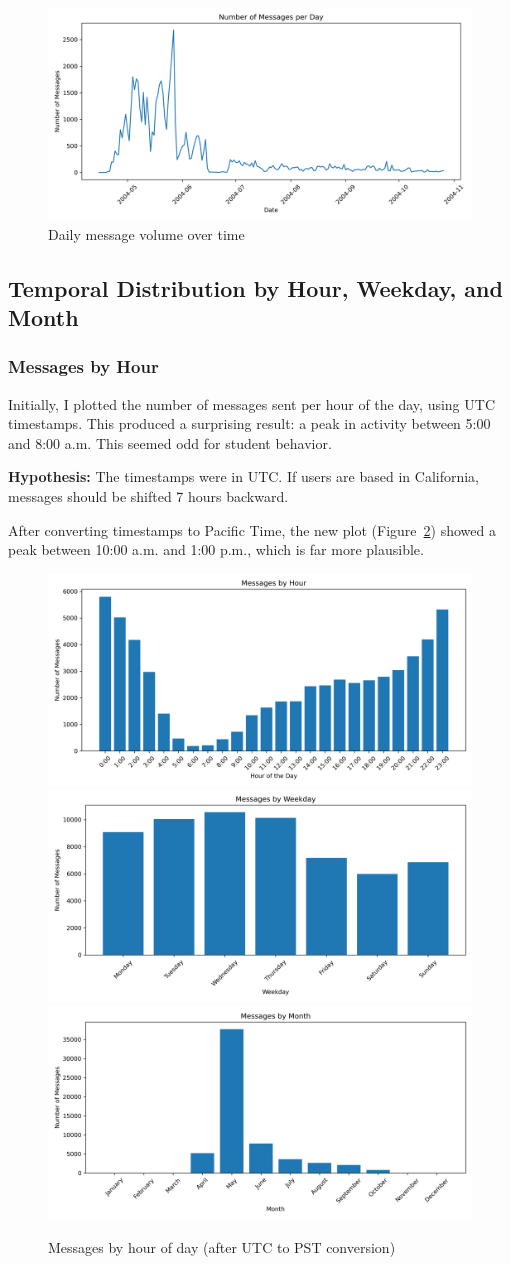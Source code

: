 \begin{figure}[H]
    \centering
    \includegraphics[width=0.4\linewidth]{../Images/messages_per_day.png}
    \caption{Daily message volume over time}
    \label{fig:messages-per-day}
\end{figure}

\subsection{Temporal Distribution by Hour, Weekday, and Month}

\subsubsection*{Messages by Hour}

Initially, I plotted the number of messages sent per hour of the day, using UTC timestamps. This produced a surprising result: a peak in activity between 5:00 and 8:00 a.m. This seemed odd for student behavior.

\textbf{Hypothesis:} The timestamps were in UTC. If users are based in California, messages should be shifted 7 hours backward.

After converting timestamps to Pacific Time, the new plot (Figure~\ref{fig:messages-by-hour}) showed a peak between 10:00 a.m. and 1:00 p.m., which is far more plausible.

\begin{figure}[H]
    \centering
    \includegraphics[width=0.3\linewidth]{../Images/messages_by_hour.png}
    \includegraphics[width=0.3\linewidth]{../Images/messages_by_weekday.png}
    \includegraphics[width=0.3\linewidth]{../Images/messages_by_month.png}
    \caption{Messages by hour of day (after UTC to PST conversion)}
    \label{fig:messages-by-hour}
\end{figure}

